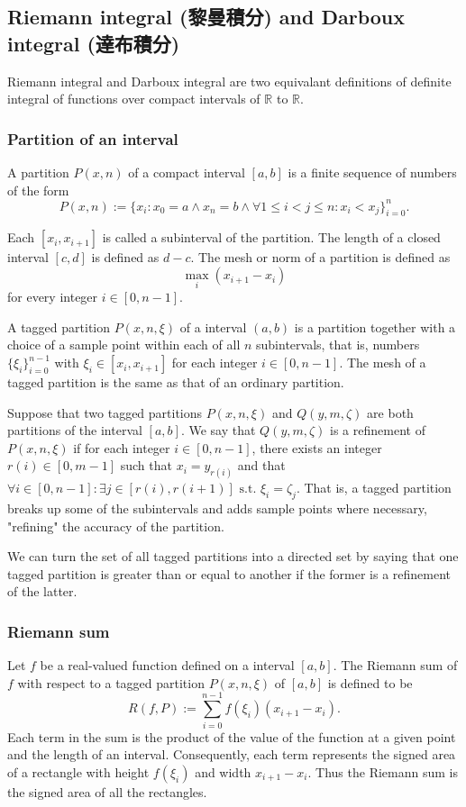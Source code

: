 \documentclass[a4paper,12pt]{report}
\begin{document}
\subsection{Riemann integral (黎曼積分) and Darboux integral (達布積分)}
Riemann integral and Darboux integral are two equivalant definitions of definite integral of functions over compact intervals of $\mathbb{R}$ to $\mathbb{R}$.
\subsubsection{Partition of an interval}
A partition $P(x, n)$ of a compact interval $[a,b]$ is a finite sequence of numbers of the form
\[P(x, n):=\{x_i\colon x_0=a\land x_n=b\land\forall 1\leq i<j\leq n\colon x_i<x_j\}_{i=0}^n.\]

Each $[x_i, x_{i+1}]$ is called a subinterval of the partition. The length of a closed interval $[c,d]$ is defined as $d-c$. The mesh or norm of a partition is defined as
\[\max_i\left(x_{i+1}-x_{i}\right)\]
for every integer $i\in [0,n-1]$.

A tagged partition $P(x,n,\xi)$ of a interval $(a,b)$ is a partition together with a choice of a sample point within each of all $n$ subintervals, that is, numbers $\{\xi_i\}_{i=0}^{n-1}$ with $\xi_i\in [x_i,x_{i+1}]$ for each integer $i\in [0,n-1]$. The mesh of a tagged partition is the same as that of an ordinary partition.

Suppose that two tagged partitions $P(x,n,\xi)$ and $Q(y,m,\zeta)$ are both partitions of the interval $[a,b]$. We say that $Q(y,m,\zeta)$ is a refinement of $P(x,n,\xi)$ if for each integer $i\in [0,n-1]$, there exists an integer $r(i)\in [0,m-1]$ such that $x_i = y_{r(i)}$ and that $\forall i\in [0,n-1]\colon\exists j\in [r(i),r(i + 1)] \text{\ s.t.\ }\xi_i = \zeta_j$. That is, a tagged partition breaks up some of the subintervals and adds sample points where necessary, "refining" the accuracy of the partition.

We can turn the set of all tagged partitions into a directed set by saying that one tagged partition is greater than or equal to another if the former is a refinement of the latter.
\subsubsection{Riemann sum}
Let $f$ be a real-valued function defined on a interval $[a,b]$. The Riemann sum of $f$ with respect to a tagged partition $P(x,n,\xi)$ of $[a,b]$ is defined to be
\[R(f,P):=\sum_{i=0}^{n-1}f(\xi_i)\left(x_{i+1}-x_i\right).\]
Each term in the sum is the product of the value of the function at a given point and the length of an interval. Consequently, each term represents the signed area of a rectangle with height $f(\xi_i)$ and width $x_{i + 1} − x_i$. Thus the Riemann sum is the signed area of all the rectangles.
\end{document}
